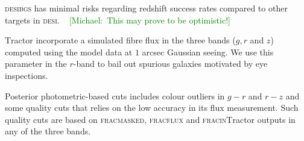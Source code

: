 \documentclass[fleqn,usenatbib]{mnras}
\newcommand{\mike}[1]{~\newline\noindent \textcolor{Green}{{ [Michael:~{#1}]\\}}}
\newcommand{\BGS}{\textsc{bgs}\xspace}
\newcommand{\DESI}{\textsc{desi}\xspace}
\newcommand{\FRACMASKED}{{\textsc{fracmasked}}\xspace}
\newcommand{\FRACFLUX}{{\textsc{fracflux}}\xspace}
\newcommand{\FRACIN}{{\textsc{fracin}}\xspace}
\newcommand{\TRACTOR}{\textsc{T}ractor\xspace}
\begin{document}
\DESI \BGS has minimal risks regarding redshift success rates compared to other targets in \DESI.  
\mike{This may prove to be optimistic!}

\TRACTOR incorporate a simulated fibre flux in the three bands ($g,r$ and $z$) computed using the model data at $1$ arcsec Gaussian seeing. We use this parameter in the $r$-band to bail out spurious galaxies motivated by eye inspections. 
 

Posterior photometric-based cuts includes colour outliers in $g-r$ and $r-z$ and some quality cuts that relies on the low accuracy in its flux measurement. Such quality cuts are based on \FRACMASKED, \FRACFLUX and \FRACIN \TRACTOR outputs in any of the three bands.
\end{document}
